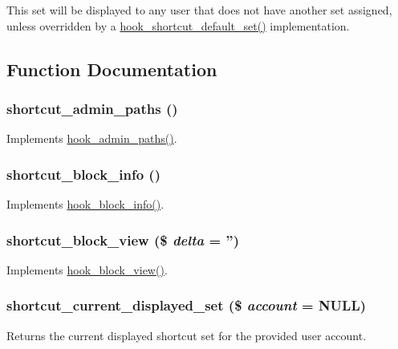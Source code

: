 This set will be displayed to any user that does not have another set assigned, unless overridden by a \hyperlink{group__hooks_ga5fe90af5e2617387b8b14dc51fc356ab}{hook\_\-shortcut\_\-default\_\-set()} implementation. 

\subsection{Function Documentation}
\hypertarget{shortcut_8module_a3e446f4def74bbd77bf2399205582a93}{
\subsubsection[{shortcut\_\-admin\_\-paths}]{\setlength{\rightskip}{0pt plus 5cm}shortcut\_\-admin\_\-paths ()}}
\label{shortcut_8module_a3e446f4def74bbd77bf2399205582a93}
Implements \hyperlink{group__hooks_ga3fe6d93afc8bb04afbd9e3c326d1bdc1}{hook\_\-admin\_\-paths()}. \hypertarget{shortcut_8module_ab81ce71e062d8cce10afac824938b790}{
\subsubsection[{shortcut\_\-block\_\-info}]{\setlength{\rightskip}{0pt plus 5cm}shortcut\_\-block\_\-info ()}}
\label{shortcut_8module_ab81ce71e062d8cce10afac824938b790}
Implements \hyperlink{group__hooks_ga2bd926c3e90deeba0c3ba64fb3c64d73}{hook\_\-block\_\-info()}. \hypertarget{shortcut_8module_acc6defd503f4040e88452c39e5d403d1}{
\subsubsection[{shortcut\_\-block\_\-view}]{\setlength{\rightskip}{0pt plus 5cm}shortcut\_\-block\_\-view (\$ {\em delta} = {\ttfamily ''})}}
\label{shortcut_8module_acc6defd503f4040e88452c39e5d403d1}
Implements \hyperlink{group__hooks_gaa14092a3e74cdc57aa295100cfd6860d}{hook\_\-block\_\-view()}. \hypertarget{shortcut_8module_aac22f4373abaf143593c41eef3284d3e}{
\subsubsection[{shortcut\_\-current\_\-displayed\_\-set}]{\setlength{\rightskip}{0pt plus 5cm}shortcut\_\-current\_\-displayed\_\-set (\$ {\em account} = {\ttfamily NULL})}}
\label{shortcut_8module_aac22f4373abaf143593c41eef3284d3e}
Returns the current displayed shortcut set for the provided user account.


